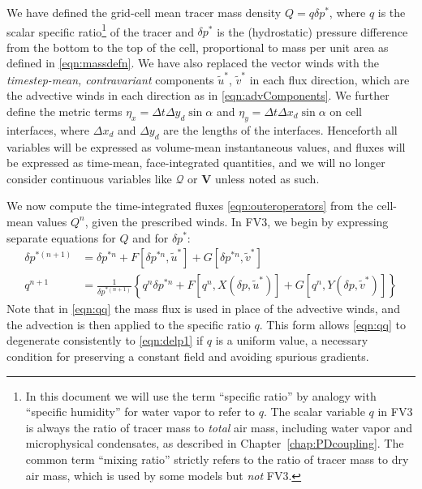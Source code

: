 \documentclass[10pt,letterpaper,margin=1in]{memoir}
\begin{document}
We have defined the grid-cell mean tracer mass density $Q = q \delta p^*$, where $q$ is the scalar specific ratio\footnote{In this document we will use the term ``specific ratio'' by analogy with ``specific humidity'' for water vapor to refer to $q$. The scalar variable $q$ in FV3 is always the ratio of tracer mass to \textit{total} air mass, including water vapor and microphysical condensates, as described in Chapter~\ref{chap:PDcoupling}. The common term ``mixing ratio'' strictly refers to the ratio of tracer mass to dry air mass, which is used by some models but \textit{not} FV3.} of the tracer and $\delta p^*$ is the (hydrostatic) pressure difference from the bottom to the top of the cell, proportional to mass per unit area as defined in \eqref{eqn:massdefn}. We have also replaced the vector winds with the \textit{timestep-mean, contravariant} components $\widetilde{u}^*$, $\widetilde{v}^*$ in each flux direction, which are the advective winds in each direction as in \eqref{eqn:advComponents}. We further define the metric terms $\eta_x = \Delta t \Delta y_d \sin \alpha$ and $\eta_y = \Delta t \Delta x_d \sin \alpha$ on cell interfaces, where $\Delta x_d$ and $\Delta y_d$ are the lengths of the interfaces. Henceforth all variables will be expressed as volume-mean instantaneous values, and fluxes will be expressed as time-mean, face-integrated quantities, and we will no longer consider continuous variables like $\mathcal{Q}$ or ${\mathbf{V}}$ unless noted as such. 

We now compute the time-integrated fluxes \eqref{eqn:outeroperators} from the cell-mean values $Q^n$, given the prescribed winds. In FV3, we begin by expressing separate equations for $Q$ and for $\delta p^*$:
\begin{align}
\delta p^{*(n+1)} & = \delta p^{*n} + F [\delta p^{*n}, \widetilde{u}^*]  + G[\delta p^{*n}, \widetilde{v}^*]
\label{eqn:delp1}\\
q^{n+1} & =  \frac{1}{\delta p^{*(n+1)}} \left \lbrace q^n \delta p^{*n} + F [q^{n}, X(\delta p,\widetilde{u}^*)]  + G[q^{n}, Y(\delta p,\widetilde{v}^*)] \right \rbrace
\label{eqn:qq}
\end{align}
Note that in \eqref{eqn:qq} the mass flux is used in place of the advective winds, and the advection is then applied to the specific ratio $q$. This form allows \eqref{eqn:qq} to degenerate consistently to \eqref{eqn:delp1} if $q$ is a uniform value, a necessary condition for preserving a constant field and avoiding spurious gradients. 
\end{document}
